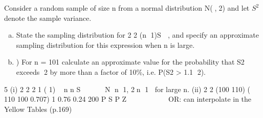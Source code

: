 \documentclass[a4paper,12pt]{article}
\begin{document}
Consider a random sample of size n from a normal distribution N(,2) and let $S^2$
denote the sample variance.
\begin{enumerate}[(a)]
    \item  State the sampling distribution for
2
2
(n 1)S

, and specify an approximate
sampling distribution for this expression when n is large. 
    \item ) For n = 101 calculate an approximate value for the probability that S2 exceeds
2 by more than a factor of 10\%, i.e. P(S2 > 1.1 2). 

\end{enumerate}





\newpage

5 (i)
2
2
2 1
( 1) ~ n
n S




 N n 1, 2n 1 for large n.
(ii)
2
2
(100 110) ( 110 100 0.707) 1 0.76 0.24
200
P S P Z 
      

OR: can interpolate in the Yellow Tables (p.169)
\end{document}
